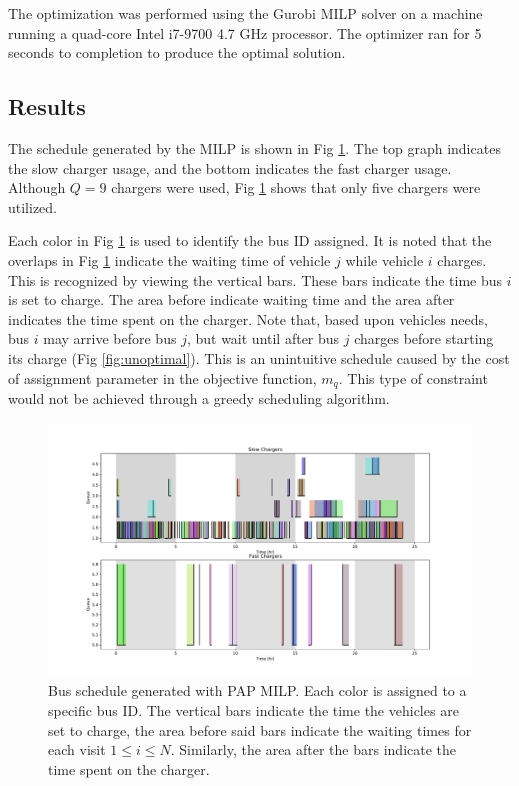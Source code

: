\documentclass[letterpaper, 10pt, conference]{IEEEtran}
\begin{document}
The optimization was performed using the Gurobi MILP solver \cite{Hespanha2018} on a machine running a quad-core Intel i7-9700 4.7 GHz processor. The optimizer ran for 5 seconds to completion to produce the optimal solution.

\subsection{Results}
The schedule generated by the MILP is shown in Fig \ref{fig:schedule}. The top graph indicates the slow charger usage, and the bottom indicates the fast charger usage. Although $Q = 9$ chargers were used, Fig \ref{fig:schedule} shows that only five chargers were utilized.

Each color in Fig \ref{fig:schedule} is used to identify the bus ID assigned. It is noted that the overlaps in Fig \ref{fig:schedule} indicate the waiting time of vehicle $j$ while vehicle $i$ charges. This is recognized by viewing the vertical bars. These bars indicate the time bus $i$ is set to charge. The area before indicate waiting time and the area after indicates the time spent on the charger. Note that, based upon vehicles needs, bus $i$ may arrive before bus $j$, but wait until after bus $j$ charges before starting its charge (Fig \ref{fig:unoptimal}). This is an unintuitive schedule caused by the cost of assignment parameter in the objective function, $m_q$. This type of constraint would not be achieved through a greedy scheduling algorithm.

\begin{figure}[ht]
	\centering
	\includegraphics[trim=1.5in 0.25in 1.5in 0.5in, width=\linewidth]{schedule.pdf}
	\caption{Bus schedule generated with PAP MILP. Each color is assigned to a specific bus ID. The vertical bars indicate the time the vehicles are set to charge, the area before said bars indicate the waiting times for each visit $1 \leq i \leq N$. Similarly, the area after the bars indicate the time spent on the charger.}
	\label{fig:schedule}
\end{figure}
\end{document}

